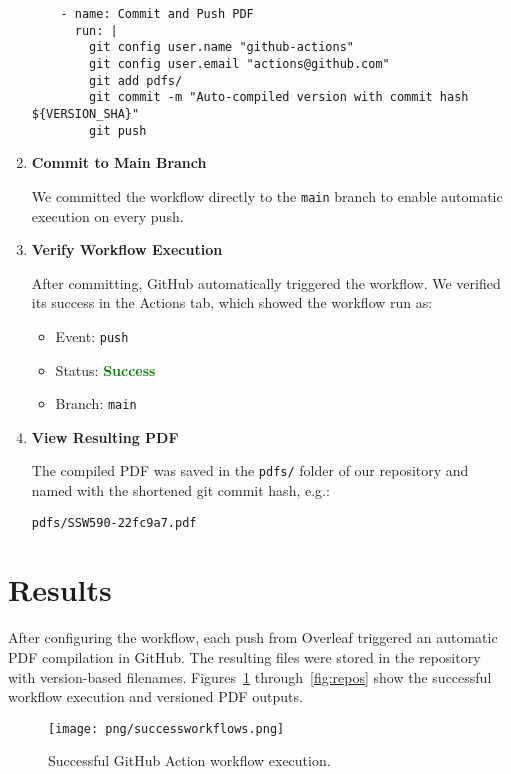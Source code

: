 \begin{enumerate}
\begin{verbatim}
    - name: Commit and Push PDF
      run: |
        git config user.name "github-actions"
        git config user.email "actions@github.com"
        git add pdfs/
        git commit -m "Auto-compiled version with commit hash ${VERSION_SHA}"
        git push
    \end{verbatim}

    \item \textbf{Commit to Main Branch}

    We committed the workflow directly to the \texttt{main} branch to enable automatic execution on every push.

    \item \textbf{Verify Workflow Execution}

    After committing, GitHub automatically triggered the workflow. We verified its success in the Actions tab, which showed the workflow run as:

    \begin{itemize}
        \item Event: \texttt{push}
        \item Status: \textcolor{green}{\textbf{Success}}
        \item Branch: \texttt{main}
    \end{itemize}

    \item \textbf{View Resulting PDF}

    The compiled PDF was saved in the \texttt{pdfs/} folder of our repository and named with the shortened git commit hash, e.g.:
    \begin{verbatim}
pdfs/SSW590-22fc9a7.pdf
    \end{verbatim}

\end{enumerate}


\section{Results}
After configuring the workflow, each push from Overleaf triggered an automatic PDF compilation in GitHub. The resulting files were stored in the repository with version-based filenames. Figures~\ref{fig:successworkflows} through~\ref{fig:repos} show the successful workflow execution and versioned PDF outputs.

\begin{figure}[H]
  \centering
  \texttt{[image: png/successworkflows.png]}
  \caption{Successful GitHub Action workflow execution.}
  \label{fig:successworkflows}
\end{figure}

